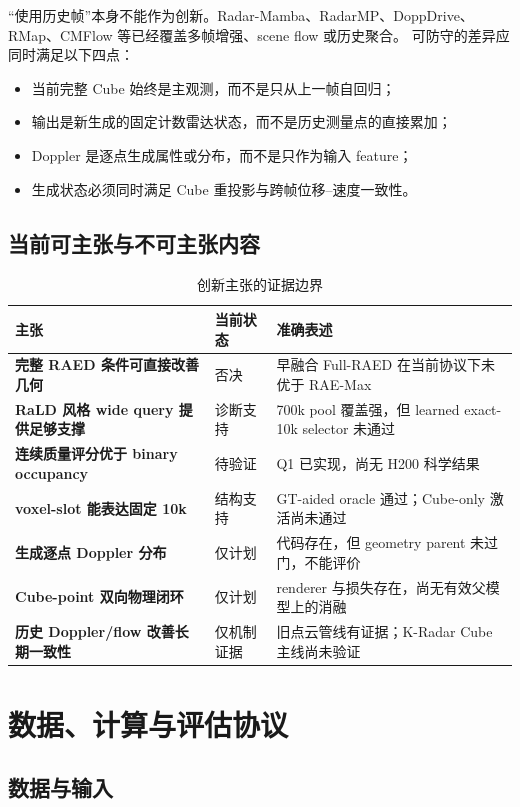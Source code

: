 \documentclass[11pt,a4paper,fontset=none]{ctexart}
\begin{document}
“使用历史帧”本身不能作为创新。Radar-Mamba、RadarMP、DoppDrive、
RMap、CMFlow 等已经覆盖多帧增强、scene flow 或历史聚合。
可防守的差异应同时满足以下四点：
\begin{itemize}
  \item 当前完整 Cube 始终是主观测，而不是只从上一帧自回归；
  \item 输出是新生成的固定计数雷达状态，而不是历史测量点的直接累加；
  \item Doppler 是逐点生成属性或分布，而不是只作为输入 feature；
  \item 生成状态必须同时满足 Cube 重投影与跨帧位移--速度一致性。
\end{itemize}

\subsection{当前可主张与不可主张内容}

\begin{table}[H]
\centering
\small
\caption{创新主张的证据边界}
\begin{tabularx}{\textwidth}{>{\bfseries}p{4.0cm} p{2.2cm} Y}
\toprule
主张 & 当前状态 & 准确表述 \\
\midrule
完整 RAED 条件可直接改善几何 & 否决 & 早融合 Full-RAED 在当前协议下未优于 RAE-Max \\
RaLD 风格 wide query 提供足够支撑 & 诊断支持 & 700k pool 覆盖强，但 learned exact-10k selector 未通过 \\
连续质量评分优于 binary occupancy & 待验证 & Q1 已实现，尚无 H200 科学结果 \\
voxel-slot 能表达固定 10k & 结构支持 & GT-aided oracle 通过；Cube-only 激活尚未通过 \\
生成逐点 Doppler 分布 & 仅计划 & 代码存在，但 geometry parent 未过门，不能评价 \\
Cube-point 双向物理闭环 & 仅计划 & renderer 与损失存在，尚无有效父模型上的消融 \\
历史 Doppler/flow 改善长期一致性 & 仅机制证据 & 旧点云管线有证据；K-Radar Cube 主线尚未验证 \\
\bottomrule
\end{tabularx}
\end{table}

\section{数据、计算与评估协议}

\subsection{数据与输入}
\end{document}
